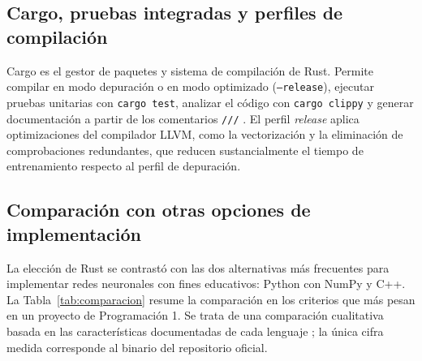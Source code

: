 \subsection{Cargo, pruebas integradas y perfiles de compilación}
Cargo es el gestor de paquetes y sistema de compilación de Rust. Permite compilar en modo depuración o en modo optimizado (\texttt{--release}), ejecutar pruebas unitarias con \texttt{cargo test}, analizar el código con \texttt{cargo clippy} y generar documentación a partir de los comentarios \texttt{///} \citep{klabnik2023}. El perfil \emph{release} aplica optimizaciones del compilador LLVM, como la vectorización y la eliminación de comprobaciones redundantes, que reducen sustancialmente el tiempo de entrenamiento respecto al perfil de depuración.

\subsection{Comparación con otras opciones de implementación}
La elección de Rust se contrastó con las dos alternativas más frecuentes para implementar redes neuronales con fines educativos: Python con NumPy y C++. La Tabla~\ref{tab:comparacion} resume la comparación en los criterios que más pesan en un proyecto de Programación 1. Se trata de una comparación cualitativa basada en las características documentadas de cada lenguaje \citep{klabnik2023,blandy2021,matsakis2014}; la única cifra medida corresponde al binario del repositorio oficial.

